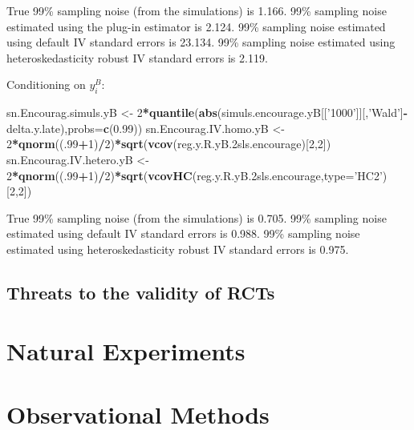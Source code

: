 \documentclass[]{book}
\newenvironment{Shaded}{\begin{snugshade}}{\end{snugshade}}
\newcommand{\KeywordTok}[1]{\textcolor[rgb]{0.13,0.29,0.53}{\textbf{#1}}}
\newcommand{\DataTypeTok}[1]{\textcolor[rgb]{0.13,0.29,0.53}{#1}}
\newcommand{\DecValTok}[1]{\textcolor[rgb]{0.00,0.00,0.81}{#1}}
\newcommand{\FloatTok}[1]{\textcolor[rgb]{0.00,0.00,0.81}{#1}}
\newcommand{\StringTok}[1]{\textcolor[rgb]{0.31,0.60,0.02}{#1}}
\newcommand{\OperatorTok}[1]{\textcolor[rgb]{0.81,0.36,0.00}{\textbf{#1}}}
\newcommand{\NormalTok}[1]{#1}
\theoremstyle{definition}
\theoremstyle{definition}
\theoremstyle{definition}
\theoremstyle{remark}
\begin{document}
True 99\% sampling noise (from the simulations) is 1.166. 99\% sampling
noise estimated using the plug-in estimator is 2.124. 99\% sampling
noise estimated using default IV standard errors is 23.134. 99\%
sampling noise estimated using heteroskedasticity robust IV standard
errors is 2.119.

Conditioning on \(y_i^B\):

\begin{Shaded}
\begin{Highlighting}[]
\NormalTok{sn.Encourag.simuls.yB <-}\StringTok{ }\DecValTok{2}\OperatorTok{*}\KeywordTok{quantile}\NormalTok{(}\KeywordTok{abs}\NormalTok{(simuls.encourage.yB[[}\StringTok{'1000'}\NormalTok{]][,}\StringTok{'Wald'}\NormalTok{]}\OperatorTok{-}\NormalTok{delta.y.late),}\DataTypeTok{probs=}\KeywordTok{c}\NormalTok{(}\FloatTok{0.99}\NormalTok{))}
\NormalTok{sn.Encourag.IV.homo.yB <-}\StringTok{ }\DecValTok{2}\OperatorTok{*}\KeywordTok{qnorm}\NormalTok{((.}\DecValTok{99}\OperatorTok{+}\DecValTok{1}\NormalTok{)}\OperatorTok{/}\DecValTok{2}\NormalTok{)}\OperatorTok{*}\KeywordTok{sqrt}\NormalTok{(}\KeywordTok{vcov}\NormalTok{(reg.y.R.yB.2sls.encourage)[}\DecValTok{2}\NormalTok{,}\DecValTok{2}\NormalTok{])}
\NormalTok{sn.Encourag.IV.hetero.yB <-}\StringTok{ }\DecValTok{2}\OperatorTok{*}\KeywordTok{qnorm}\NormalTok{((.}\DecValTok{99}\OperatorTok{+}\DecValTok{1}\NormalTok{)}\OperatorTok{/}\DecValTok{2}\NormalTok{)}\OperatorTok{*}\KeywordTok{sqrt}\NormalTok{(}\KeywordTok{vcovHC}\NormalTok{(reg.y.R.yB.2sls.encourage,}\DataTypeTok{type=}\StringTok{'HC2'}\NormalTok{)[}\DecValTok{2}\NormalTok{,}\DecValTok{2}\NormalTok{])}
\end{Highlighting}
\end{Shaded}

True 99\% sampling noise (from the simulations) is 0.705. 99\% sampling
noise estimated using default IV standard errors is 0.988. 99\% sampling
noise estimated using heteroskedasticity robust IV standard errors is
0.975.

\section{Threats to the validity of RCTs}\label{sec:threats}

\chapter{Natural Experiments}\label{NE}

\chapter{Observational Methods}\label{sec:OM}
\end{document}
